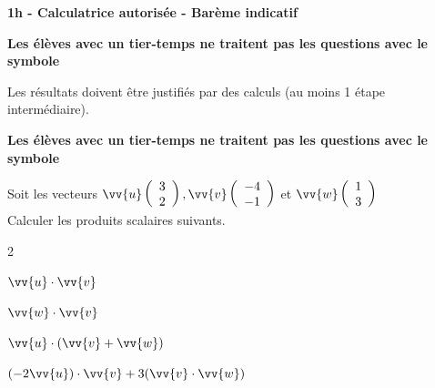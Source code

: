 \documentclass[12pt,a4paper]{article}  %
\begin{document}
\graphicspath{{images/}}

\begin{center}

\end{center}


\begin{center}\textbf{1h - Calculatrice autorisée - Barème indicatif}\end{center}

\begin{center}\textbf{Les élèves avec un tier-temps ne traitent pas les questions avec  le symbole }\end{center}

\begin{center}
Les résultats doivent être justifiés par des calculs (au moins 1 étape intermédiaire).
\end{center}

\begin{center}\textbf{Les élèves avec un tier-temps ne traitent pas les questions avec  le symbole }\end{center}

Soit les vecteurs $\vv{u}\left(\begin{array}{l}3 \\ 2\end{array}\right), \vv{v}\left(\begin{array}{c}-4 \\ -1\end{array}\right)$ et $\vv{w}\left(\begin{array}{l}1 \\ 3\end{array}\right)$\\
Calculer les produits scalaires suivants.
\begin{multicols}{2}
\begin{enumMet}
    \item $\vv{u} \cdot \vv{v}$
    \item $\vv{w} \cdot \vv{v}$
    \item {} $\vv{u} \cdot(\vv{v}+\vv{w})$
    \item $(-2 \vv{u}) \cdot \vv{v}+3(\vv{v} \cdot \vv{w})$
\end{enumMet}
\end{multicols}
\end{document}
